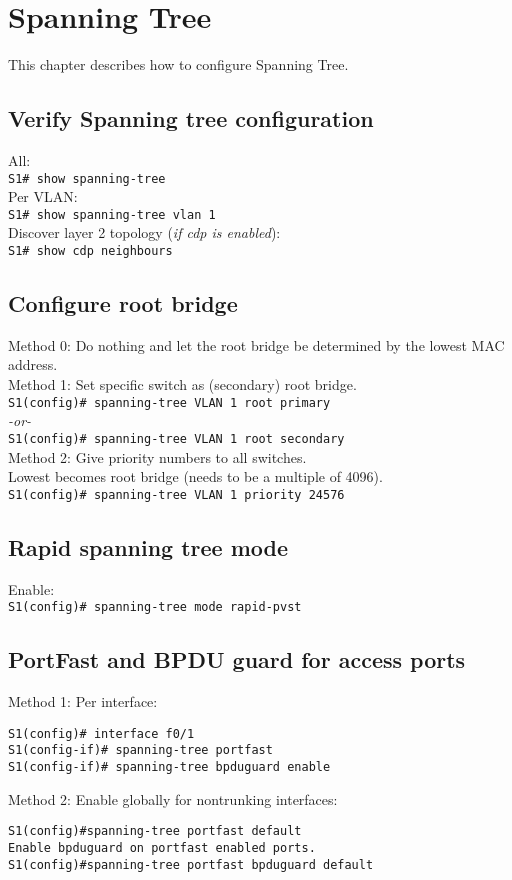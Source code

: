 \section{Spanning Tree}
This chapter describes how to configure Spanning Tree.
\subsection{Verify Spanning tree configuration}
All: \\
\verb!S1# show spanning-tree! \\
Per VLAN: \\
\verb!S1# show spanning-tree vlan 1! \\
Discover layer 2 topology (\textit{if cdp is enabled}): \\
\verb!S1# show cdp neighbours!\\

\subsection{Configure root bridge}
Method 0: Do nothing and let the root bridge be determined by the lowest MAC address. \\
Method 1: Set specific switch as (secondary) root bridge. \\
\verb!S1(config)# spanning-tree VLAN 1 root primary! \\
\textit{-or-} \\
\verb!S1(config)# spanning-tree VLAN 1 root secondary! \\
Method 2: Give priority numbers to all switches. \\
Lowest becomes root bridge (needs to be a multiple of 4096). \\
\verb!S1(config)# spanning-tree VLAN 1 priority 24576!

\subsection{Rapid spanning tree mode}
Enable: \\
\verb!S1(config)# spanning-tree mode rapid-pvst! \\

\subsection{PortFast and BPDU guard for access ports}
Method 1: Per interface:
\begin{verbatim}
S1(config)# interface f0/1
S1(config-if)# spanning-tree portfast
S1(config-if)# spanning-tree bpduguard enable
\end{verbatim}
Method 2: Enable globally for nontrunking interfaces:
\begin{verbatim}
S1(config)#spanning-tree portfast default
Enable bpduguard on portfast enabled ports.
S1(config)#spanning-tree portfast bpduguard default
\end{verbatim}
